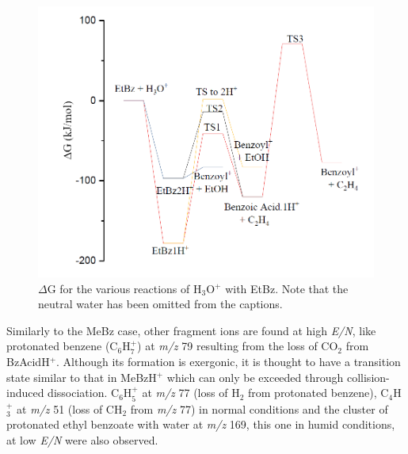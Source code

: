 




\begin{figure}[htbp]
\centering
\includegraphics[width=0.7\linewidth]{pics/cocaine-chapter/etbz_deltag.png}
\caption{$\Delta$G for the various reactions of H$_3$O$^+$ with EtBz. Note that the neutral water has been omitted from the captions.}
\label{fig:etbz_deltag}
\end{figure}








Similarly to the MeBz case, other fragment ions are found at high \textit{E/N}, like
protonated benzene (C$_6$H$_7^+$) at \textit{m/z} 79 resulting from the loss of  CO$_2$ from BzAcidH$^+$. 
%
Although its formation is exergonic, it is thought to have a transition state similar to that in MeBzH$^+$ which can only be exceeded through collision-induced dissociation.
%
C$_6$H$_5^+$ at \textit{m/z} 77 (loss of H$_2$ from protonated benzene), 
C$_4$H$_3^+$ at \textit{m/z} 51 (loss of CH$_2$ from \textit{m/z} 77) in normal conditions and
the cluster of protonated ethyl benzoate with water at \textit{m/z} 169, this one in humid conditions, at low \textit{E/N} were also observed.














